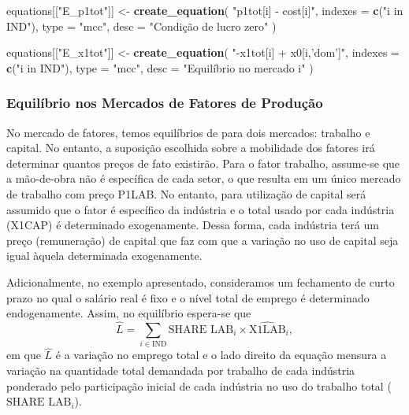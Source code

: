 \documentclass[12pt,twoside]{article}
\newenvironment{Shaded}{\begin{snugshade}}{\end{snugshade}}
\newcommand{\DataTypeTok}[1]{\textcolor[rgb]{0.13,0.29,0.53}{#1}}
\newcommand{\KeywordTok}[1]{\textcolor[rgb]{0.13,0.29,0.53}{\textbf{#1}}}
\newcommand{\NormalTok}[1]{#1}
\newcommand{\StringTok}[1]{\textcolor[rgb]{0.31,0.60,0.02}{#1}}
\let\oldShaded\Shaded
\let\endoldShaded\endShaded
\renewenvironment{Shaded}{\footnotesize\oldShaded}{\endoldShaded}
\begin{document}
\begin{Shaded}
\begin{Highlighting}[]
\NormalTok{equations[[}\StringTok{"E_p1tot"}\NormalTok{]] <-}\StringTok{ }\KeywordTok{create_equation}\NormalTok{(}
  \StringTok{"p1tot[i] - cost[i]"}\NormalTok{,}
  \DataTypeTok{indexes =} \KeywordTok{c}\NormalTok{(}\StringTok{"i in IND"}\NormalTok{),}
  \DataTypeTok{type =} \StringTok{"mcc"}\NormalTok{,}
  \DataTypeTok{desc =} \StringTok{"Condição de lucro zero"}
\NormalTok{)}

\NormalTok{equations[[}\StringTok{"E_x1tot"}\NormalTok{]] <-}\StringTok{ }\KeywordTok{create_equation}\NormalTok{(}
  \StringTok{"-x1tot[i] + x0[i,'dom']"}\NormalTok{,}
  \DataTypeTok{indexes =} \KeywordTok{c}\NormalTok{(}\StringTok{"i in IND"}\NormalTok{),}
  \DataTypeTok{type =} \StringTok{"mcc"}\NormalTok{,}
  \DataTypeTok{desc =} \StringTok{"Equilíbrio no mercado i"}
\NormalTok{)}
\end{Highlighting}
\end{Shaded}

\hypertarget{equiluxedbrio-nos-mercados-de-fatores-de-produuxe7uxe3o}{%
\subsubsection{Equilíbrio nos Mercados de Fatores de
Produção}\label{equiluxedbrio-nos-mercados-de-fatores-de-produuxe7uxe3o}}

No mercado de fatores, temos equilíbrios de para dois mercados: trabalho
e capital. No entanto, a suposição escolhida sobre a mobilidade dos
fatores irá determinar quantos preços de fato existirão. Para o fator
trabalho, assume-se que a mão-de-obra não é específica de cada setor, o
que resulta em um único mercado de trabalho com preço P1LAB. No entanto,
para utilização de capital será assumido que o fator é específico da
indústria e o total usado por cada indústria (X1CAP) é determinado
exogenamente. Dessa forma, cada indústria terá um preço (remuneração) de
capital que faz com que a variação no uso de capital seja igual àquela
determinada exogenamente.

Adicionalmente, no exemplo apresentado, consideramos um fechamento de
curto prazo no qual o salário real é fixo e o nível total de emprego é
determinado endogenamente. Assim, no equilíbrio espera-se que
\[\hat{L} = \sum_{i \in \text{IND}} \text{SHARE LAB}_i \times \hat{\text{X1LAB}}_i,\]
em que \(\hat{L}\) é a variação no emprego total e o lado direito da
equação mensura a variação na quantidade total demandada por trabalho de
cada indústria ponderado pelo participação inicial de cada indústria no
uso do trabalho total (\(\text{SHARE LAB}_i\)).
\end{document}
